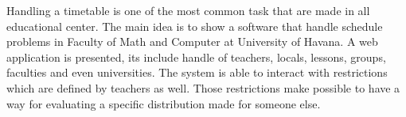 \begin{english_abstract}
Handling a timetable is one of the most common task that are made in all educational center. The main idea is to show a software that handle schedule problems in Faculty of Math and Computer at University of Havana. A web application is presented, its include handle of teachers, locals, lessons, groups, faculties and even universities. The system is able to interact with restrictions which are defined by teachers as well. Those restrictions make possible to have a way for evaluating a specific distribution made for someone else.
\end{english_abstract}